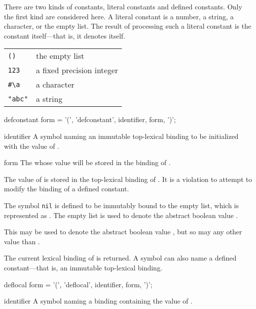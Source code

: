 \begin{optDefinition}
\noindent
%
\noindent
There are two kinds of constants, literal
constants and defined constants.  Only the
first kind are considered here.  A literal constant is a number, a string, a
character, or the empty list.  The result of processing such a literal constant
is the constant itself---that is, it denotes
itself.
%
\examples
\begin{tabular}{ll}
    \verb+()+ & the empty list\\
    \verb+123+ & a fixed precision integer\\
    \verb+#\a+ & a character\\
    \verb+"abc"+ & a string
\end{tabular}

%
\Syntax
\savesyntax{}\vbox{\syntax
defconstant form
   = '(', 'defconstant', identifier, form, ')';
\endsyntax}
%
\begin{arguments}
    \item[identifier] A symbol naming an immutable top-lexical binding to be
    initialized with the value of .

    \item[form] The  whose value will be stored in the binding of
    .
\end{arguments}
%
\remarks%
The value of  is stored in the top-lexical binding of .
It is a violation to attempt to modify the binding of a defined constant.

%
\remarks%
The symbol {\tt nil} is defined to be immutably bound to the empty list, which
is represented as \nil{}.  The empty list is used to denote the abstract boolean
value .

%
\remarks%
This may be used to denote the abstract boolean value , but so may any
other value than \nil{}.

\noindent
The current lexical binding of  is
returned.  A symbol can also name a defined
constant---that is, an immutable top-lexical binding.

%
\Syntax
\savesyntax{}\vbox{\syntax
deflocal form
   = '(', 'deflocal', identifier, form, ')';
\endsyntax}
%
\begin{arguments}
    \item[identifier] A symbol naming a binding containing the value of
    .


\end{arguments}
\end{optDefinition}
